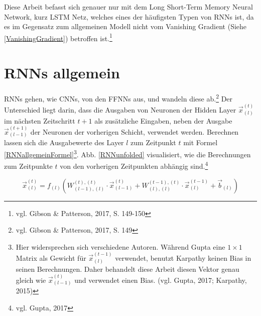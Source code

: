 \documentclass[
	a4paper,
	12pt,
	ngerman,
	oneside
]{scrreprt}											%
\newcommand{\practitioner}[1]{vgl. Gibson \& Patterson, 2017, S. {#1}}
\begin{document}
		Diese Arbeit befasst sich genauer nur mit dem Long Short-Term Memory Neural Network, kurz LSTM Netz, welches eines der häufigsten Typen von RNNs ist, da es im Gegensatz zum allgemeinen Modell nicht vom Vanishing Gradient (Siehe \ref{VanishingGradient}) betroffen ist.\footnote{\practitioner{149-150}}
				
				
				
		\section{RNNs allgemein}
			RNNs gehen, wie CNNs, von den FFNNs aus, und wandeln diese ab.\footnote{\practitioner{149}} Der Unterschied liegt darin, dass die Ausgaben von Neuronen der Hidden Layer $\vec{x}_{(l)}^{(t)}$ im nächsten Zeitschritt $t+1$ als zusätzliche Eingaben, neben der Ausgabe $\vec{x}_{(l-1)}^{(t+1)}$ der Neuronen der vorherigen Schicht, verwendet werden. Berechnen lassen sich die Ausgabewerte des Layer $l$ zum Zeitpunkt $t$ mit Formel \ref{RNNallgemeinFormel}\footnote{Hier widersprechen sich verschiedene Autoren. Während Gupta eine $1 \times 1$ Matrix als Gewicht für $\vec{x}_{(l)}^{(t-1)}$ verwendet, benutzt Karpathy keinen Bias in seinen Berechnungen. Daher behandelt diese Arbeit diesen Vektor genau gleich wie $\vec{x}_{(l-1)}^{(t)}$ und verwendet einen Bias. (vgl. Gupta, 2017; Karpathy, 2015)}. Abb. \ref{RNNunfolded} visualisiert, wie die Berechnungen zum Zeitpunkte $t$ von den vorherigen Zeitpunkten abhängig sind.\footnote{vgl. Gupta, 2017}
				
			\begin{equation}\label{RNNallgemeinFormel}
				\vec{x}_{(l)}^{(t)} = f_{(l)} ( W_{(l-1), (l)}^{(t),(t)} \cdot \vec{x}_{(l-1)}^{(t)} + W_{(l),(l)}^{(t-1),(t)} \cdot \vec{x}_{(l)}^{(t-1)} + \vec{b}_{(l)})
			\end{equation}
		
				
				
\end{document}

